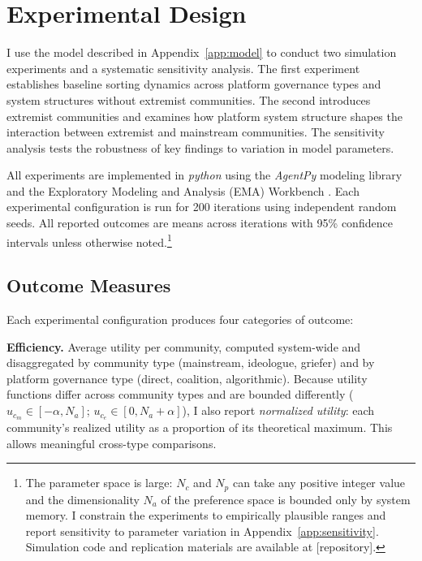 \documentclass{article}
\begin{document}
\section{Experimental Design}
\label{app:design}

I use the model described in Appendix~\ref{app:model} to conduct two simulation experiments and a systematic sensitivity analysis. The first experiment establishes baseline sorting dynamics across platform governance types and system structures without extremist communities. The second introduces extremist communities and examines how platform system structure shapes the interaction between extremist and mainstream communities. The sensitivity analysis tests the robustness of key findings to variation in model parameters.

All experiments are implemented in \textit{python} using the \textit{AgentPy} modeling library \citep{foramitti2021agentpy} and the Exploratory Modeling and Analysis (EMA) Workbench \citep{bankesExploratoryModelingPolicy1993}. Each experimental configuration is run for 200 iterations using independent random seeds. All reported outcomes are means across iterations with 95\% confidence intervals unless otherwise noted.\footnote{The parameter space is large: $N_c$ and $N_p$ can take any positive integer value and the dimensionality $N_a$ of the preference space is bounded only by system memory. I constrain the experiments to empirically plausible ranges and report sensitivity to parameter variation in Appendix~\ref{app:sensitivity}. Simulation code and replication materials are available at [repository].}

\subsection{Outcome Measures}
\label{sec:outcomes}

Each experimental configuration produces four categories of outcome:

\textbf{Efficiency.} Average utility per community, computed system-wide and disaggregated by community type (mainstream, ideologue, griefer) and by platform governance type (direct, coalition, algorithmic). Because utility functions differ across community types and are bounded differently ($u_{c_m} \in [-\alpha, N_a]$; $u_{c_e} \in [0, N_a + \alpha]$), I also report \textit{normalized utility}: each community's realized utility as a proportion of its theoretical maximum. This allows meaningful cross-type comparisons.
\end{document}
